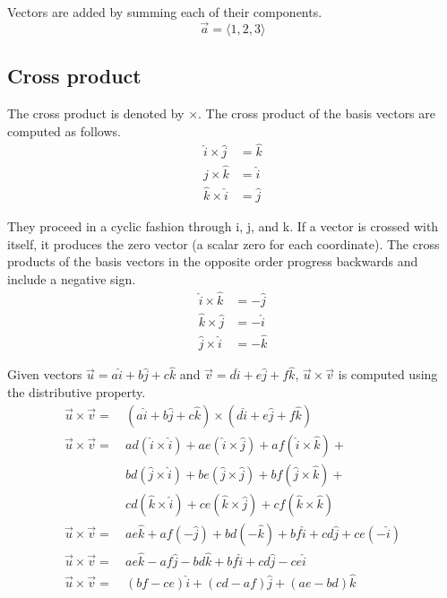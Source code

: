 Vectors are added by summing each of their components.
\begin{equation*}
  \vec{a} = \langle 1, 2, 3 \rangle
\end{equation*}

\subsection{Cross product}

The cross product is denoted by $\times$. The cross product of the basis vectors
are computed as follows.
\begin{align*}
  \hat{i} \times \hat{j} &= \hat{k} \\
  \hat{j} \times \hat{k} &= \hat{i} \\
  \hat{k} \times \hat{i} &= \hat{j}
\end{align*}

They proceed in a cyclic fashion through i, j, and k. If a vector is crossed
with itself, it produces the zero vector (a scalar zero for each coordinate).
The cross products of the basis vectors in the opposite order progress backwards
and include a negative sign.
\begin{align*}
  \hat{i} \times \hat{k} &= -\hat{j} \\
  \hat{k} \times \hat{j} &= -\hat{i} \\
  \hat{j} \times \hat{i} &= -\hat{k}
\end{align*}

Given vectors
$\vec{u} = a\hat{i} + b\hat{j} + c\hat{k}$ and
$\vec{v} = d\hat{i} + e\hat{j} + f\hat{k}$, $\vec{u} \times \vec{v}$ is computed
using the distributive property.
\begin{align*}
  \vec{u} \times \vec{v} =&~(a\hat{i} + b\hat{j} + c\hat{k}) \times
    (d\hat{i} + e\hat{j} + f\hat{k}) \\
  \vec{u} \times \vec{v} =&~ad(\hat{i} \times \hat{i}) + ae(\hat{i} \times
    \hat{j}) + af(\hat{i} \times \hat{k}) + \\
    &~bd(\hat{j} \times \hat{i}) + be(\hat{j} \times \hat{j}) +
    bf(\hat{j} \times \hat{k}) + \\
    &~cd(\hat{k} \times \hat{i}) + ce(\hat{k} \times \hat{j}) +
    cf(\hat{k} \times \hat{k}) \\
  \vec{u} \times \vec{v} =&~ae\hat{k} + af(-\hat{j}) + bd(-\hat{k}) +
    bf\hat{i} + cd\hat{j} + ce(-\hat{i}) \\
  \vec{u} \times \vec{v} =&~ae\hat{k} - af\hat{j} - bd\hat{k} + bf\hat{i} +
    cd\hat{j} - ce\hat{i} \\
  \vec{u} \times \vec{v} =&~(bf - ce)\hat{i} + (cd - af)\hat{j} +
    (ae - bd)\hat{k}
\end{align*}

